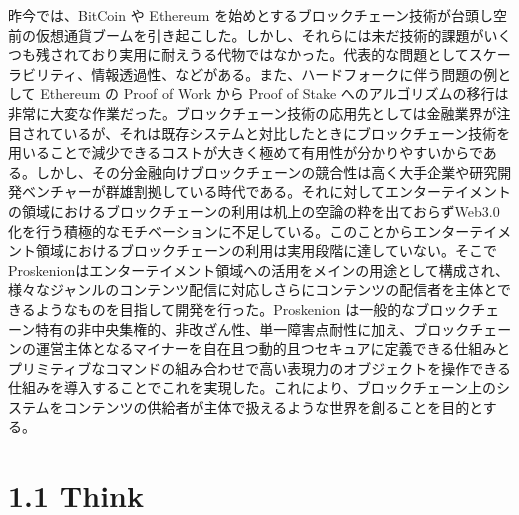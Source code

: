 昨今では、BitCoin や Ethereum
を始めとするブロックチェーン技術が台頭し空前の仮想通貨ブームを引き起こした。しかし、それらには未だ技術的課題がいくつも残されており実用に耐えうる代物ではなかった。代表的な問題としてスケーラビリティ、情報透過性、などがある。また、ハードフォークに伴う問題の例として
Ethereum の Proof of Work から Proof of Stake
へのアルゴリズムの移行は非常に大変な作業だった。ブロックチェーン技術の応用先としては金融業界が注目されているが、それは既存システムと対比したときにブロックチェーン技術を用いることで減少できるコストが大きく極めて有用性が分かりやすいからである。しかし、その分金融向けブロックチェーンの競合性は高く大手企業や研究開発ベンチャーが群雄割拠している時代である。それに対してエンターテイメントの領域におけるブロックチェーンの利用は机上の空論の粋を出ておらずWeb3.0化を行う積極的なモチベーションに不足している。このことからエンターテイメント領域におけるブロックチェーンの利用は実用段階に達していない。そこでProskenionはエンターテイメント領域への活用をメインの用途として構成され、様々なジャンルのコンテンツ配信に対応しさらにコンテンツの配信者を主体とできるようなものを目指して開発を行った。Proskenion
は一般的なブロックチェーン特有の非中央集権的、非改ざん性、単一障害点耐性に加え、ブロックチェーンの運営主体となるマイナーを自在且つ動的且つセキュアに定義できる仕組みとプリミティブなコマンドの組み合わせで高い表現力のオブジェクトを操作できる仕組みを導入することでこれを実現した。これにより、ブロックチェーン上のシステムをコンテンツの供給者が主体で扱えるような世界を創ることを目的とする。

\hypertarget{think}{%
\section{1.1 Think}\label{think}}

